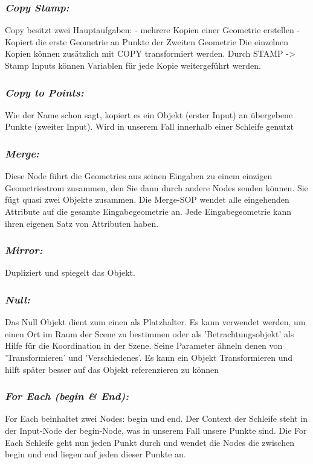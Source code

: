 \documentclass[paper=a4,fontsize=12pt,ngerman]{scrartcl}
\begin{document}
	\subsubsection*{\textit{Copy Stamp:}}
	Copy besitzt zwei Hauptaufgaben:
	- mehrere Kopien einer Geometrie erstellen
	- Kopiert die erste Geometrie an Punkte der Zweiten Geometrie
	Die einzelnen Kopien können zusätzlich mit COPY transformiert werden. 
	Durch STAMP -> Stamp Inputs können Variablen für jede Kopie weitergeführt werden. 
	\subsubsection*{\textit{Copy to Points:}}
	Wie der Name schon sagt, kopiert es ein Objekt (erster Input) an übergebene Punkte (zweiter Input). Wird in unserem Fall innerhalb einer Schleife genutzt
	\subsubsection*{\textit{Merge:}}
	Diese Node führt die Geometries aus seinen Eingaben zu einem einzigen Geometriestrom zusammen, den Sie dann durch andere Nodes senden können. Sie fügt quasi zwei Objekte zusammen. Die Merge-SOP wendet alle eingehenden Attribute auf die gesamte Eingabegeometrie an. Jede Eingabegeometrie kann ihren eigenen Satz von Attributen haben.
	\subsubsection*{\textit{Mirror:}}
	Dupliziert und spiegelt das Objekt. 
	\subsubsection*{\textit{Null:}}
	Das Null Objekt dient zum einen als Platzhalter. Es kann verwendet werden, um einen Ort im Raum der Scene zu bestimmen oder als 'Betrachtungsobjekt' als Hilfe für die Koordination in der Szene. Seine Parameter ähneln denen von 'Transformieren' und 'Verschiedenes'. Es kann ein Objekt Transformieren und hilft später besser auf das Objekt referenzieren zu können
	\subsubsection*{\textit{For Each (begin \& End):}}
	For Each beinhaltet zwei Nodes: begin und end. Der Context der Schleife steht in der Input-Node der begin-Node, was in unserem Fall unsere Punkte sind. Die For Each Schleife geht nun jeden Punkt durch und wendet die Nodes die zwischen begin und end liegen auf jeden dieser Punkte an.
	
\end{document}
